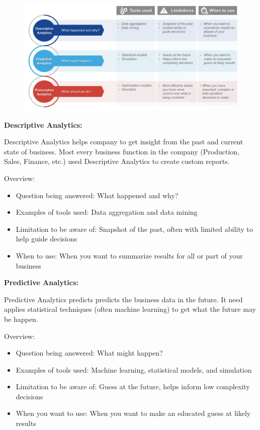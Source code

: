 \documentclass[]{book}
\providecommand{\tightlist}{%
  \setlength{\itemsep}{0pt}\setlength{\parskip}{0pt}}
\begin{document}
\begin{figure}
\centering
\includegraphics{analytics.png}
\caption{}
\end{figure}

\textbf{Descriptive Analytics: }

Descriptive Analytics helps company to get insight from the past and
current state of business. Most every business function in the company
(Production, Sales, Finance, etc.) used Descriptive Analytics to create
custom reports.

Overview:

\begin{itemize}
\tightlist
\item
  Question being answered: What happened and why?
\item
  Examples of tools used: Data aggregation and data mining
\item
  Limitation to be aware of: Snapshot of the past, often with limited
  ability to help guide decisions
\item
  When to use: When you want to summarize results for all or part of
  your business
\end{itemize}

\textbf{Predictive Analytics: }

Predictive Analytics predicts predicts the business data in the future.
It need applies statistical techniques (often machine learning) to get
what the future may be happen.

Overview:

\begin{itemize}
\tightlist
\item
  Question being answered: What might happen?
\item
  Examples of tools used: Machine learning, statistical models, and
  simulation
\item
  Limitation to be aware of: Guess at the future, helps inform low
  complexity decisions
\item
  When you want to use: When you want to make an educated guess at
  likely results
\end{itemize}
\end{document}
